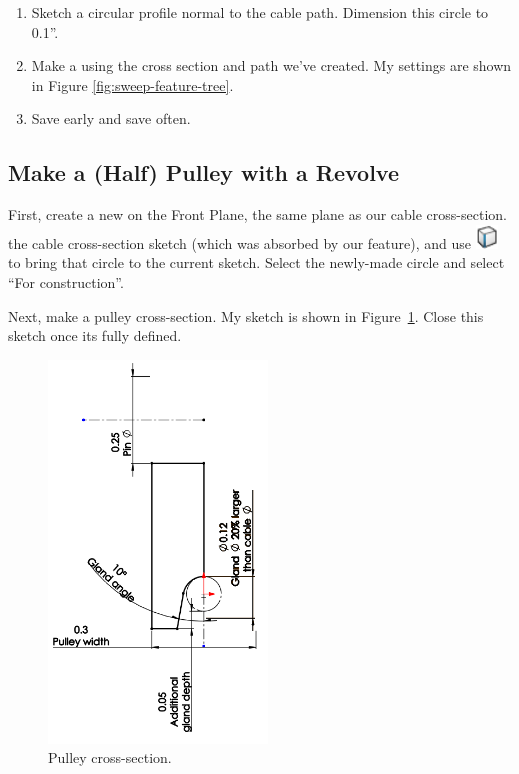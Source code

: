 \begin{enumerate}
\item{} Sketch a circular profile normal to the cable path. Dimension this circle to
0.1''.
\item{} Make a  using the cross section and path we've created. My settings are
shown in Figure \ref{fig:sweep-feature-tree}.
\item{} Save early and save often.
\end{enumerate}

\subsection{Make a (Half) Pulley with a Revolve}

\label{sec:make_the_pulley}

First, create a new  on the Front Plane, the same plane as our cable
cross-section.  the cable cross-section sketch (which was absorbed by our  feature), and use  \includegraphics{images/symbols/convert-entities.png}
to bring that circle to the current sketch. Select the newly-made circle and
select ``For construction''.

Next, make a pulley cross-section. My sketch is shown in Figure~\ref{fig:pulley-cross-section}. Close this sketch once its fully defined.

\begin{figure}[H]
\begin{center}
  \includegraphics[height=4in]{images/figures/pulley-cross-section.png}
\end{center}
\caption{Pulley cross-section.
\label{fig:pulley-cross-section}}

\end{figure}

